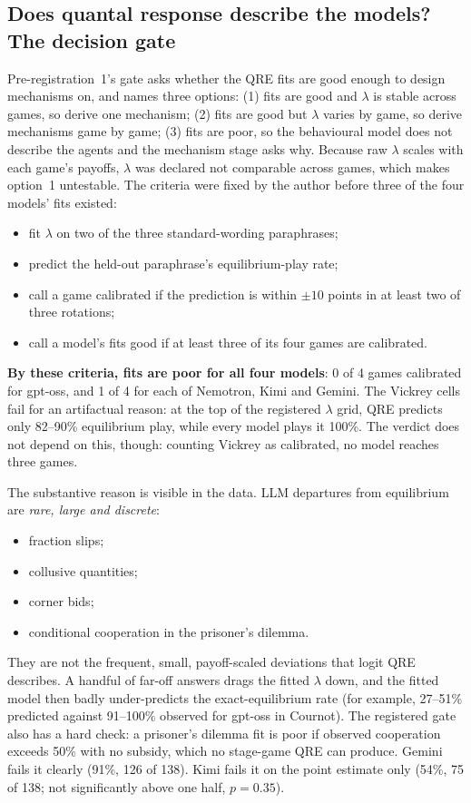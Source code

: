 \documentclass[11pt]{article}
\theoremstyle{definition}
\theoremstyle{remark}
\newcommand{\lam}{\lambda}
\begin{document}
\subsection{Does quantal response describe the models? The decision gate}

Pre-registration~1's gate asks whether the QRE fits are good enough to design mechanisms on, and
names three options: (1) fits are good and $\lam$ is stable across games, so derive one
mechanism; (2) fits are good but $\lam$ varies by game, so derive mechanisms game by game; (3)
fits are poor, so the behavioural model does not describe the agents and the mechanism stage
asks why. Because raw $\lam$ scales with each game's payoffs, $\lam$ was declared not comparable
across games, which makes option~1 untestable. The criteria were fixed by the author before
three of the four models' fits existed:
\begin{itemize}
\item fit $\lam$ on two of the three standard-wording paraphrases;
\item predict the held-out paraphrase's equilibrium-play rate;
\item call a game calibrated if the prediction is within $\pm10$ points in at least two of three
  rotations;
\item call a model's fits good if at least three of its four games are calibrated.
\end{itemize}
\textbf{By these criteria, fits are poor for all four models}: 0 of 4 games calibrated for
gpt-oss, and 1 of 4 for each of Nemotron, Kimi and Gemini. The Vickrey cells fail for an artifactual reason: at the top of the registered
$\lam$ grid, QRE predicts only 82--90\% equilibrium play, while every model plays it 100\%. The
verdict does not depend on this, though: counting Vickrey as calibrated, no model reaches three
games.

The substantive reason is visible in the data. LLM departures from equilibrium are \emph{rare,
large and discrete}:
\begin{itemize}
\item fraction slips;
\item collusive quantities;
\item corner bids;
\item conditional cooperation in the prisoner's dilemma.
\end{itemize}
They are not the frequent, small, payoff-scaled deviations that logit QRE describes. A handful
of far-off answers drags the fitted $\lam$ down, and the fitted model then badly under-predicts
the exact-equilibrium rate (for example, 27--51\% predicted against 91--100\% observed for
gpt-oss in Cournot). The registered gate also has a hard check: a
prisoner's dilemma fit is poor if observed cooperation exceeds 50\% with no subsidy, which no
stage-game QRE can produce. Gemini fails it clearly (91\%, 126 of 138). Kimi fails it on the
point estimate only (54\%, 75 of 138; not significantly above one half, $p=0.35$).
\end{document}
